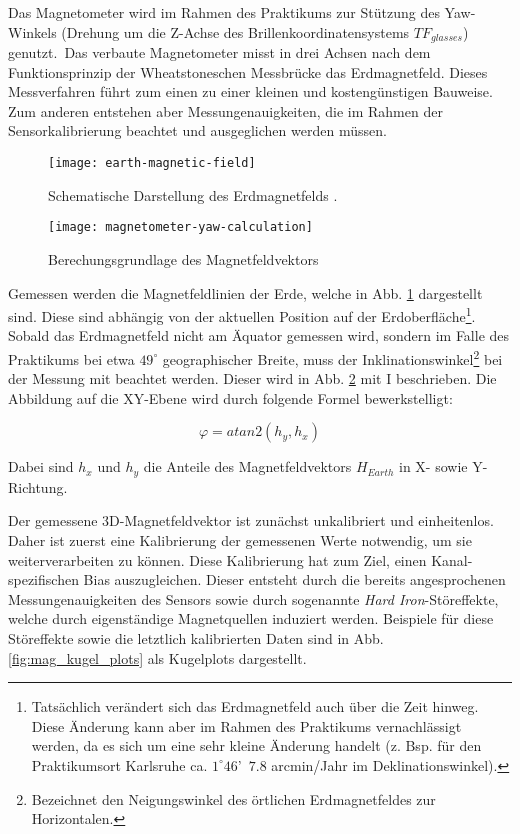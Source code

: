 Das Magnetometer wird im Rahmen des Praktikums zur Stützung des Yaw-Winkels (Drehung um die Z-Achse des Brillenkoordinatensystems $TF_{glasses}$) genutzt.\
Das verbaute Magnetometer misst in drei Achsen nach dem Funktionsprinzip der Wheatstoneschen Messbrücke \cite{renaudin2010complete} das Erdmagnetfeld.
Dieses Messverfahren führt zum einen zu einer kleinen und kostengünstigen Bauweise.
Zum anderen entstehen aber Messungenauigkeiten, die im Rahmen der Sensorkalibrierung beachtet und ausgeglichen werden müssen.

\begin{figure}[h]
   \centering
   \texttt{[image: earth-magnetic-field]}
   \caption[mag_world]{Schematische Darstellung des Erdmagnetfelds \cite{mag_world_source}.}
   \label{fig:mag_world}
\end{figure}

\begin{figure}[h]
   \centering
   \texttt{[image: magnetometer-yaw-calculation]}
   \caption[mag_mapping]{Berechungsgrundlage des Magnetfeldvektors}
   \label{fig:mag_mapping}
\end{figure}

Gemessen werden die Magnetfeldlinien der Erde, welche in Abb. \ref{fig:mag_world} dargestellt sind.
Diese sind abhängig von der aktuellen Position auf der Erdoberfläche\footnote{Tatsächlich verändert sich das Erdmagnetfeld auch über die Zeit hinweg.
Diese Änderung kann aber im Rahmen des Praktikums vernachlässigt werden, da es sich um eine sehr kleine Änderung handelt (z. Bsp. für den Praktikumsort Karlsruhe ca. $1^\circ 46$'~$7.8$ arcmin/Jahr im Deklinationswinkel).}.
Sobald das Erdmagnetfeld nicht am Äquator gemessen wird, sondern im Falle des Praktikums bei etwa $49^\circ$ geographischer Breite, muss der Inklinationswinkel\footnote{Bezeichnet den Neigungswinkel des örtlichen Erdmagnetfeldes zur Horizontalen.} bei der Messung mit beachtet werden.
Dieser wird in Abb. \ref{fig:mag_mapping} mit I beschrieben.
Die Abbildung auf die XY-Ebene wird durch folgende Formel bewerkstelligt:

\begin{equation}
    \varphi = atan2(h_y,h_x)
\end{equation}

Dabei sind $h_x$ und $h_y$ die Anteile des Magnetfeldvektors $H_{Earth}$ in X- sowie Y- Richtung.

Der gemessene 3D-Magnetfeldvektor ist zunächst unkalibriert und einheitenlos.
Daher ist zuerst eine Kalibrierung der gemessenen Werte notwendig, um sie weiterverarbeiten zu können.
Diese Kalibrierung hat zum Ziel, einen Kanal-spezifischen Bias auszugleichen. 
Dieser entsteht durch die bereits angesprochenen Messungenauigkeiten des Sensors sowie durch sogenannte \textit{Hard Iron}-Störeffekte, welche durch eigenständige Magnetquellen induziert werden.
Beispiele für diese Störeffekte sowie die letztlich kalibrierten Daten sind in Abb. \ref{fig:mag_kugel_plots} als Kugelplots dargestellt.

